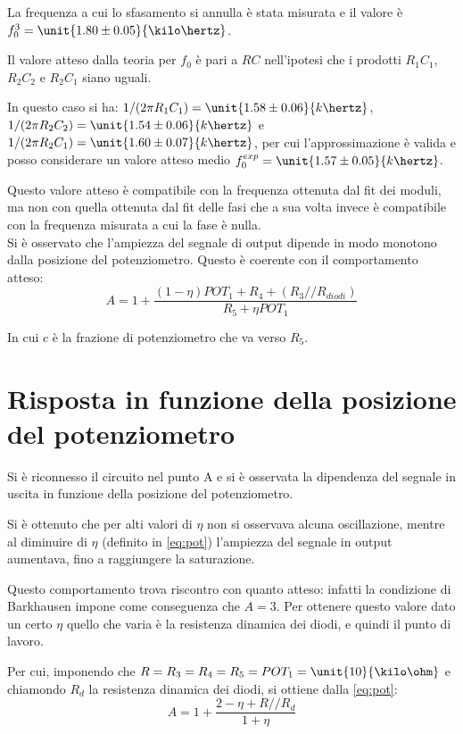 \documentclass[10pt,a4paper]{article}
\begin{document}

La frequenza a cui lo sfasamento si annulla è stata misurata e il valore è $f_0^3 = \unit{1.80 \pm 0.05}{\kilo\hertz}$.

Il valore atteso dalla teoria per $f_0$ è pari a $RC$ nell'ipotesi che i prodotti $R_1 C_1$, $R_2  C_2$ e $R_2  C_1$ siano uguali. 

In questo caso si ha: $1/(2\pi R_1 C_1) = \unit{1.58 \pm 0.06}{k\hertz}$, $1/(2\pi R_2 C_2) = \unit{1.54 \pm 0.06}{k\hertz}$ e $1/(2\pi R_2 C_1) = \unit{1.60 \pm 0.07}{k\hertz}$, per cui l'approssimazione è valida e posso considerare un valore atteso medio $f_0^{exp} = \unit{1.57 \pm 0.05}{k\hertz}$.

Questo valore atteso è compatibile con la frequenza ottenuta dal fit dei moduli, ma non con quella ottenuta dal fit delle fasi che a sua volta invece è compatibile con la frequenza misurata a cui la fase è nulla.\\

Si è osservato che l'ampiezza del segnale di output dipende in modo monotono dalla posizione del potenziometro. Questo è coerente con il comportamento atteso:
\begin{equation}
A = 1 + \frac{(1-\eta)POT_1 + R_4 + (R_3//R_{diodi})}{R_5 + \eta POT_1}
\label{eq:pot}
\end{equation}

In cui $c$ è la frazione di potenziometro che va verso $R_5$.

\section{Risposta in funzione della posizione del potenziometro}
Si è riconnesso il circuito nel punto A e si è osservata la dipendenza del segnale in uscita in funzione della posizione del potenziometro.

Si è ottenuto che per alti valori di $\eta$ non si osservava alcuna oscillazione, mentre al diminuire di $\eta$ (definito in \eqref{eq:pot}) l'ampiezza del segnale in output aumentava, fino a raggiungere la saturazione.

Questo comportamento trova riscontro con quanto atteso: infatti la condizione di Barkhausen impone come conseguenza che $A = 3$. Per ottenere questo valore dato un certo $\eta$ quello che varia è la resistenza dinamica dei diodi, e quindi il punto di lavoro.

Per cui, imponendo che $R = R_3 = R_4 = R_5 = POT_1 = \unit{10}{\kilo\ohm}$ e chiamondo $R_d$ la resistenza dinamica dei diodi, si ottiene dalla \eqref{eq:pot}:
\begin{equation}
A = 1 + \frac{2 - \eta + R//R_d}{1+\eta}
\end{equation}
\end{document}
